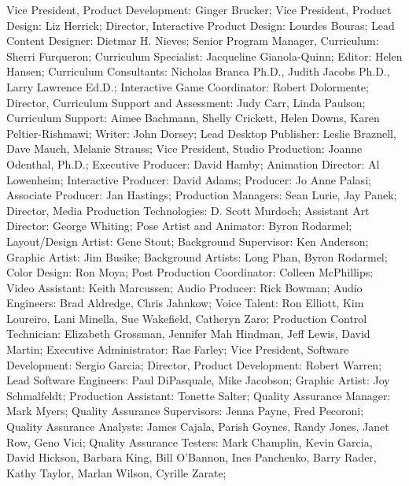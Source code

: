 Vice President, Product Development: Ginger Brucker;
Vice President, Product Design: Liz Herrick;
Director, Interactive Product Design: Lourdes Bouras;
Lead Content Designer: Dietmar H. Nieves;
Senior Program Manager, Curriculum: Sherri Furqueron;
Curriculum Specialist: Jacqueline Gianola-Quinn;
Editor: Helen Hansen;
Curriculum Consultants: Nicholas Branca Ph.D., Judith Jacobs Ph.D., Larry Lawrence Ed.D.;
Interactive Game Coordinator: Robert Dolormente;
Director, Curriculum Support and Assessment: Judy Carr, Linda Paulson;
Curriculum Support: Aimee Bachmann, Shelly Crickett, Helen Downs, Karen Peltier-Rishmawi;
Writer: John Dorsey;
Lead Desktop Publisher: Leslie Braznell, Dave Mauch, Melanie Strauss;
Vice President, Studio Production: Joanne Odenthal, Ph.D.;
Executive Producer: David Hamby;
Animation Director: Al Lowenheim;
Interactive Producer: David Adams;
Producer: Jo Anne Palasi;
Associate Producer: Jan Hastings;
Production Managers: Sean Lurie, Jay Panek;
Director, Media Production Technologies: D. Scott Murdoch;
Assistant Art Director: George Whiting;
Pose Artist and Animator: Byron Rodarmel;
Layout/Design Artist: Gene Stout;
Background Supervisor: Ken Anderson;
Graphic Artist: Jim Busike;
Background Artists: Long Phan, Byron Rodarmel;
Color Design: Ron Moya;
Post Production Coordinator: Colleen McPhillips;
Video Assistant: Keith Marcussen;
Audio Producer: Rick Bowman;
Audio Engineers: Brad Aldredge, Chris Jahnkow;
Voice Talent: Ron Elliott, Kim Loureiro, Lani Minella, Sue Wakefield, Catheryn Zaro;
Production Control Technician: Elizabeth Grossman, Jennifer Mah Hindman, Jeff Lewis, David Martin;
Executive Administrator: Rae Farley;
Vice President, Software Development: Sergio Garcia;
Director, Product Development: Robert Warren;
Lead Software Engineers: Paul DiPasquale, Mike Jacobson;
Graphic Artist: Joy Schmalfeldt;
Production Assistant: Tonette Salter;
Quality Assurance Manager: Mark Myers;
Quality Assurance Supervisors: Jenna Payne, Fred Pecoroni;
Quality Assurance Analysts: James Cajala, Parish Goynes, Randy Jones, Janet Row, Geno Vici;
Quality Assurance Testers: Mark Champlin, Kevin Garcia, David Hickson, Barbara King, Bill O'Bannon, Ines Panchenko, Barry Rader, Kathy Taylor, Marlan Wilson, Cyrille Zarate;